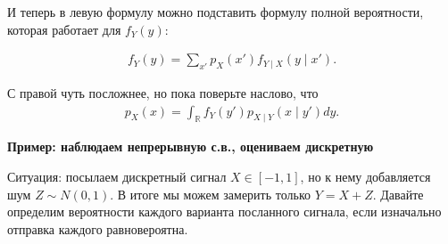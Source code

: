 \documentclass[12pt]{article}
\newcommand\R{\mathbb{R}}
\begin{document}
\begin{center}
  \hspace{2cm}
\end{center}

И теперь в левую формулу можно подставить формулу полной вероятности, которая работает для $f_Y(y)$:

\begin{align*}
  f_Y(y) = \sum_{x'} p_X(x') f_{Y \mid X}(y \mid x'). 
\end{align*}

С правой чуть посложнее, но пока поверьте наслово, что
\begin{align*}
  p_X(x) = \int_{\R} f_Y(y') p_{X \mid Y}(x \mid y') dy. 
\end{align*}

\textbf{Пример: наблюдаем непрерывную с.в., оцениваем дискретную}

\begin{center}
\end{center}

Ситуация: посылаем дискретный сигнал $X \in [-1, 1]$, но к нему добавляется шум $Z \sim N(0, 1)$. В итоге мы можем замерить только $Y = X + Z$. Давайте определим вероятности каждого варианта посланного сигнала, если изначально отправка каждого равновероятна.
\end{document}
